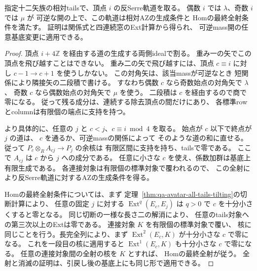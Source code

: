 \begin{proposition}[可逆mass開での反Serre豊富性の直接判定]
\label{prop:qa-avatar-presented-pointing-ampleness}
指定十二矢族の相対tailsで、頂点 $i$ の反Serre軌道を取る。
偶数 $i$ では $\lambda$、奇数 $i$ では $\mu$ が
可逆な開の上で、この軌道は相対AZの生成条件と
Homの最終全射条件を満たす。
証明は関係式と四連続窓のExt計算から得られ、
可逆mass開の任意基底変更に適用できる。
\end{proposition}
\begin{proof}
頂点 $i+4\mathbb Z$ を経由する道の生成する両側idealで割る。
重み一の矢でこの頂点を飛び越すことはできない。
重み二の矢で飛び越すには、頂点 $c\equiv i$ に対し
$c-1\to c+1$ を使うしかない。
この対角矢は、該当massが可逆なとき
短関係により隣接矢の二段積で書ける。
すなわち偶数 $c$ なら奇数始点の対角矢で $\lambda$、
奇数 $c$ なら偶数始点の対角矢で $\mu$ を使う。
二段積は $c$ を経由するので商で零になる。
従って残る成分は、連続する除去頂点の間だけにあり、
各標準rowとcolumnは有限個の端点に支持を持つ。

より具体的に、任意の $j$ と $c<j$、$c\equiv i\bmod4$ を取る。
始点が $c$ 以下で終点が $j$ の道は、
$c$ を通るか、可逆massの関係によって
そのような道の和に直せる。
従って $P_c\otimes_R A_{cj}\to P_j$ の余核は
有限区間に支持を持ち、tailsで零である。
ここで $A_{cj}$ は $c$ から $j$ への成分である。
任意に小さな $c$ を使え、係数加群は基底上有限生成である。
各連接対象は有限個の標準対象で覆われるので、
この全射により反Serre軌道に対するAZの生成条件を得る。

Homの最終全射条件については、まず
定理~\ref{thm:qa-avatar-all-tails-tilting}の切断計算により、
任意の固定 $j$ に対する $\operatorname{Ext}^{q}(E_c,E_j)$ は
$q>0$ で $c$ を十分小さくすると零となる。
同じ切断の一様な長さ二の解消により、
任意のtails対象への第三次以上のExtは零である。
連接対象 $K$ を有限個の標準対象で覆い、
核に同じことを行う。長完全列により、まず
$\operatorname{Ext}^2(E_c,K)$ が十分小さな $c$ で零になる。
これを一段目の核に適用すると
$\operatorname{Ext}^1(E_c,K)$ も十分小さな $c$ で零になる。
任意の連接対象間の全射の核を $K$ とすれば、
Homの最終全射が従う。
全射と消滅の証明は、引戻し後の基底上にも同じ形で適用できる。
\end{proof}

